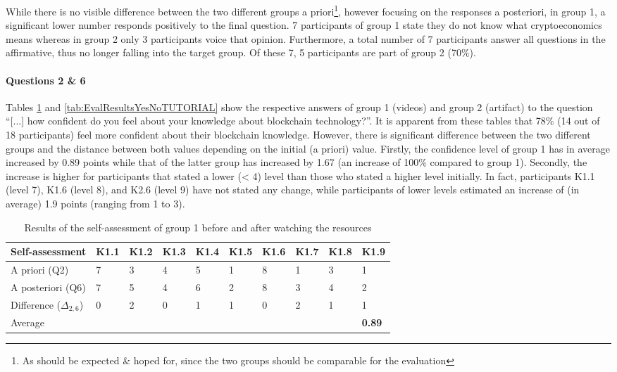 While there is no visible difference between the two different groups a priori\footnote{As should be expected \& hoped for, since the two groups should be comparable for the evaluation}, however focusing on the responses a posteriori, in group 1, a significant lower number responds positively to the final question. 7 participants of group 1 state they do not know what cryptoeconomics means whereas in group 2 only 3 participants voice that opinion. Furthermore, a total number of 7 participants answer all questions in the affirmative, thus no longer falling into the target group. Of these 7, 5 participants are part of group 2 (70\%).

\paragraph{Questions 2 \& 6} Tables \ref{tab:EvalResultsYesNoVIDEO} and \ref{tab:EvalResultsYesNoTUTORIAL} show the respective answers of group 1 (videos) and group 2 (artifact) to the question \enquote{[...] how confident do you feel about your knowledge about blockchain technology?}.
It is apparent from these tables that 78\% (14 out of 18 participants) feel more confident about their blockchain knowledge. However, there is significant difference between the two different groups and the distance between both values depending on the initial (a priori) value. Firstly, the confidence level of group 1 has in average increased by 0.89 points while that of the latter group has increased by 1.67 (an increase of 100\% compared to group 1). Secondly, the increase is higher for participants that stated a lower (< 4) level than those who stated a higher level initially. In fact, participants K1.1 (level 7), K1.6 (level 8), and K2.6 (level 9) have not stated any change, while participants of lower levels estimated an increase of (in average) 1.9 points (ranging from 1 to 3).   


\begin{table}[]
    \centering
    \begin{tabular}{l | l l l l l l l l l }
          Self-assessment & K1.1 & K1.2 & K1.3 & K1.4 & K1.5 & K1.6 & K1.7 & K1.8 & K1.9  \\
         \hline
         A priori (Q2) & 7 & 3 & 4 & 5 & 1 & 8 & 1 & 3 & 1 \\
         A posteriori (Q6) & 7 & 5 & 4 & 6 & 2 & 8 & 3 & 4 & 2 \\
          \hline 
         Difference ($\Delta_{2,6}$) & 0 & 2 & 0 & 1 & 1 & 0 & 2 & 1 & 1 \\
         Average & & & & & & & & & \textbf{0.89} \cellcolor[gray]{0.9} \\
    \end{tabular}
    \caption{Results of the self-assessment of group 1 before and after watching the resources}
    \label{tab:EvalResultsYesNoVIDEO}
\end{table}

